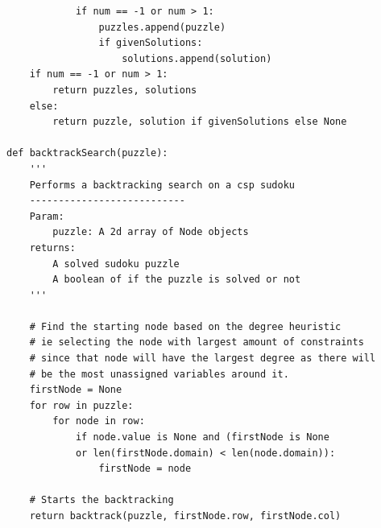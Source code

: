 \documentclass{article}
\begin{document}
\begin{verbatim}
            if num == -1 or num > 1:
                puzzles.append(puzzle)
                if givenSolutions:
                    solutions.append(solution)
    if num == -1 or num > 1:
        return puzzles, solutions
    else:
        return puzzle, solution if givenSolutions else None

def backtrackSearch(puzzle):
    '''
    Performs a backtracking search on a csp sudoku
    ---------------------------
    Param:
        puzzle: A 2d array of Node objects
    returns:
        A solved sudoku puzzle
        A boolean of if the puzzle is solved or not
    '''

    # Find the starting node based on the degree heuristic
    # ie selecting the node with largest amount of constraints
    # since that node will have the largest degree as there will
    # be the most unassigned variables around it.
    firstNode = None
    for row in puzzle:
        for node in row:
            if node.value is None and (firstNode is None 
            or len(firstNode.domain) < len(node.domain)):
                firstNode = node

    # Starts the backtracking
    return backtrack(puzzle, firstNode.row, firstNode.col)
\end{verbatim}
\newpage
\end{document}
